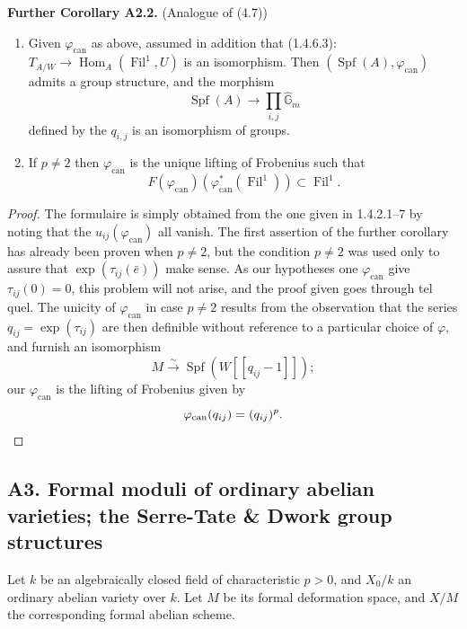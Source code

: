 \documentclass[12pt,a4paper]{article}
\theoremstyle{plain}
\theoremstyle{definition}
\theoremstyle{remark}
\DeclareMathOperator{\Fil}{Fil}
\DeclareMathOperator{\Hom}{Hom}
\DeclareMathOperator{\Spf}{Spf}
\providecommand{\Hom}{\operatorname{Hom}}
\begin{document}
\textbf{Further Corollary A2.2.} (Analogue of (4.7))
\begin{enumerate}[label=(\arabic*)]
\item Given $\varphi_{\mathrm{can}}$ as above, assumed in addition that (1.4.6.3): $T_{A/W} \to \Hom_A(\Fil^1, U)$ is an isomorphism. Then $(\Spf(A), \varphi_{\mathrm{can}})$ admits a group structure, and the morphism
\[
\Spf(A) \longrightarrow \prod_{i,j} \hat{\mathbb{G}}_m
\]
defined by the $q_{i,j}$ is an isomorphism of groups.
\item If $p \neq 2$ then $\varphi_{\mathrm{can}}$ is the unique lifting of Frobenius such that
\[
F(\varphi_{\mathrm{can}})(\varphi_{\mathrm{can}}^*(\Fil^1)) \subset \Fil^1.
\]
\end{enumerate}

\begin{proof}
The formulaire is simply obtained from the one given in 1.4.2.1--7 by noting that the $u_{ij}(\varphi_{\mathrm{can}})$ all vanish. The first assertion of the further corollary has already been proven when $p \neq 2$, but the condition $p \neq 2$ was used only to assure that $\exp(\tau_{ij}(\bar{e}))$ make sense. As our hypotheses one $\varphi_{\mathrm{can}}$ give $\tau_{ij}(0) = 0$, this problem will not arise, and the proof given goes through tel quel. The unicity of $\varphi_{\mathrm{can}}$ in case $p \neq 2$ results from the observation that the series $q_{ij} = \exp(\tau_{ij})$ are then definible without reference to a particular choice of $\varphi$, and furnish an isomorphism
\[
M \xrightarrow{\sim} \Spf(W[[q_{ij} - 1]]);
\]
our $\varphi_{\mathrm{can}}$ is the lifting of Frobenius given by
\[
\varphi_{\mathrm{can}}(q_{ij}) = (q_{ij})^p. \qedhere
\]
\end{proof}

\subsection*{A3. Formal moduli of ordinary abelian varieties; the Serre-Tate \& Dwork group structures}

Let $k$ be an algebraically closed field of characteristic $p > 0$, and $X_0/k$ an ordinary abelian variety over $k$. Let $M$ be its formal deformation space, and $X/M$ the corresponding formal abelian scheme.
\end{document}
